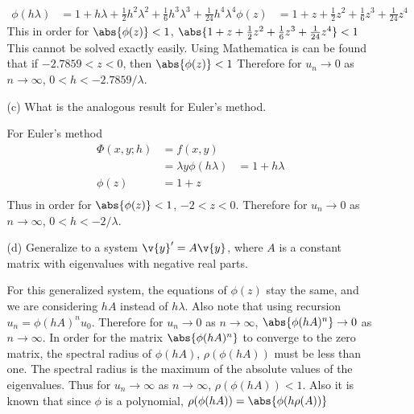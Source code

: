 \documentclass[11pt]{article}
\begin{document}
\begin{enumerate}
\begin{enumerate}
\begin{align*}
                    \phi(h\lambda) &= 1 + h\lambda + \frac{1}{2} h^2 \lambda^2 + \frac{1}{6} h^3 \lambda^3 + \frac{1}{24} h^4 \lambda^4
                    \phi(z) &= 1 + z + \frac{1}{2} z^2 + \frac{1}{6} z^3 + \frac{1}{24} z^4
                \end{align*}
                This in order for $\abs{\phi(z)} < 1$,
                $\abs{1 + z + \frac{1}{2} z^2 + \frac{1}{6} z^3 + \frac{1}{24} z^4} < 1$
                This cannot be solved exactly easily.
                Using Mathematica is can be found that if $-2.7859 < z < 0$, then $\abs{\phi(z)} < 1$
                Therefore for $u_n \to 0$ as $n \to \infty$, $0 < h < -2.7859/\lambda$.

            \item[(c)]
                What is the analogous result for Euler's method.

                For Euler's method
                \begin{align*}
                    \Phi(x,y;h) &= f(x,y) \\
                    &= \lambda y
                    \phi(h\lambda) &= 1 + h\lambda \\
                    \phi(z) & = 1 + z \\
                \end{align*}
                Thus in order for $\abs{\phi(z)} < 1$, $-2 < z < 0$.
                Therefore for $u_n \to 0$ as $n \to \infty$, $0 < h < -2/\lambda$.

            \item[(d)]
                Generalize to a system $\v{y}' = A\v{y}$, where $A$ is a
                constant matrix with eigenvalues with negative real parts.

                For this generalized system, the equations of $\phi(z)$ stay the
                same, and we are considering $hA$ instead of $h\lambda$.
                Also note that using recursion $u_n = \phi(hA)^n u_0$.
                Therefore for $u_n \to 0$ as $n \to \infty$,
                $\abs{\phi(hA)^n} \to 0$ as $n \to \infty$.
                In order for the matrix $\abs{\phi(hA)^n}$ to converge to
                the zero matrix, the spectral radius of $\phi(hA)$, $\rho(\phi(hA))$
                must be less than one.
                The spectral radius is the maximum of the absolute values of the eigenvalues.
                Thus for $u_n \to \infty$ as $n \to \infty$, $\rho(\phi(hA)) < 1$.
                Also it is known that since $\phi$ is a polynomial, $\rho(\phi(hA)) = \abs{\phi(h\rho(A))}$


\end{enumerate}
\end{enumerate}
\end{document}
